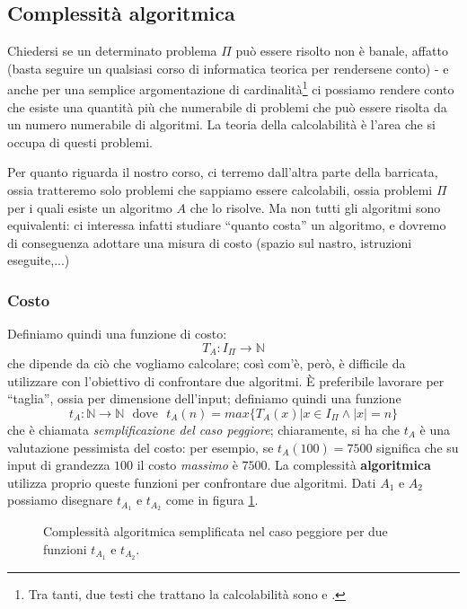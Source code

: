 \subsection{Complessità algoritmica}
Chiedersi se un determinato problema $\Pi$ può essere risolto
non è banale, affatto (basta seguire un qualsiasi corso di informatica teorica
per rendersene conto) - e anche per una semplice argomentazione di cardinalità\footnote{
	Tra tanti, due testi che trattano la calcolabilità sono \cite{hopcroft_1979} e
	\cite{kfoury_1982}.
}
ci possiamo rendere conto che esiste una quantità più che numerabile di problemi
che può essere risolta da un numero numerabile di algoritmi. La teoria della
calcolabilità è l'area che si occupa di questi problemi.

Per quanto riguarda il nostro corso, ci terremo dall'altra parte della barricata,
ossia tratteremo solo problemi che sappiamo essere calcolabili, ossia problemi
$\Pi$ per i quali esiste un algoritmo $A$ che lo risolve.
Ma non tutti gli algoritmi sono equivalenti: ci interessa
infatti studiare ``quanto costa'' un algoritmo, e dovremo di conseguenza
adottare una misura di costo (spazio sul nastro, istruzioni eseguite,...)

\subsubsection{Costo}
Definiamo quindi una funzione di costo:
$$
	T_A : I_{\Pi} \rightarrow \mathbb{N}
$$
che dipende da ciò che vogliamo calcolare; così com'è, però, è difficile da
utilizzare con l'obiettivo di confrontare due algoritmi. \`E preferibile
lavorare per ``taglia'', ossia per dimensione dell'input;
definiamo quindi una funzione
$$
	t_A:\mathbb{N} \rightarrow \mathbb{N} ~~~ \text{dove} ~~~ t_A(n) = max\{T_A(x)|x \in I_{\Pi} \land |x| = n\}
$$
che è chiamata \textit{semplificazione del caso peggiore}; chiaramente, si ha
che $t_A$ è una valutazione pessimista del costo: per esempio, se $t_A(100) = 7500$
significa che su input di grandezza $100$ il costo \textit{massimo} è $7500$.
La complessità \textbf{algoritmica} utilizza proprio queste funzioni
per confrontare due algoritmi. Dati $A_1$ e $A_2$ possiamo disegnare $t_{A_1}$
e $t_{A_2}$ come in figura \ref{fig:t1t2algcomp}.


\begin{figure}[ht]
	\centering
	\caption{Complessità algoritmica semplificata nel caso peggiore per due funzioni $t_{A_1}$ e $t_{A_2}$.}
	\label{fig:t1t2algcomp}
\end{figure}

